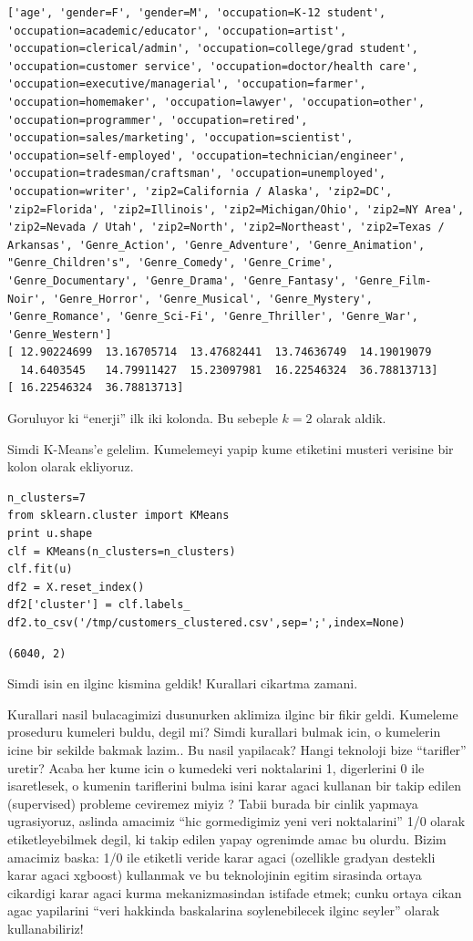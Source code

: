 \documentclass[12pt,fleqn]{article}\usepackage{../common}
\begin{document}
\begin{verbatim}
['age', 'gender=F', 'gender=M', 'occupation=K-12 student', 'occupation=academic/educator', 'occupation=artist', 'occupation=clerical/admin', 'occupation=college/grad student', 'occupation=customer service', 'occupation=doctor/health care', 'occupation=executive/managerial', 'occupation=farmer', 'occupation=homemaker', 'occupation=lawyer', 'occupation=other', 'occupation=programmer', 'occupation=retired', 'occupation=sales/marketing', 'occupation=scientist', 'occupation=self-employed', 'occupation=technician/engineer', 'occupation=tradesman/craftsman', 'occupation=unemployed', 'occupation=writer', 'zip2=California / Alaska', 'zip2=DC', 'zip2=Florida', 'zip2=Illinois', 'zip2=Michigan/Ohio', 'zip2=NY Area', 'zip2=Nevada / Utah', 'zip2=North', 'zip2=Northeast', 'zip2=Texas / Arkansas', 'Genre_Action', 'Genre_Adventure', 'Genre_Animation', "Genre_Children's", 'Genre_Comedy', 'Genre_Crime', 'Genre_Documentary', 'Genre_Drama', 'Genre_Fantasy', 'Genre_Film-Noir', 'Genre_Horror', 'Genre_Musical', 'Genre_Mystery', 'Genre_Romance', 'Genre_Sci-Fi', 'Genre_Thriller', 'Genre_War', 'Genre_Western']
[ 12.90224699  13.16705714  13.47682441  13.74636749  14.19019079
  14.6403545   14.79911427  15.23097981  16.22546324  36.78813713]
[ 16.22546324  36.78813713]
\end{verbatim}

Goruluyor ki ``enerji'' ilk iki kolonda. Bu sebeple $k=2$ olarak aldik.

Simdi K-Means'e gelelim. Kumelemeyi yapip kume etiketini musteri verisine
bir kolon olarak ekliyoruz. 

\begin{verbatim}
n_clusters=7
from sklearn.cluster import KMeans
print u.shape
clf = KMeans(n_clusters=n_clusters)
clf.fit(u)    
df2 = X.reset_index()
df2['cluster'] = clf.labels_
df2.to_csv('/tmp/customers_clustered.csv',sep=';',index=None)
\end{verbatim}

\begin{verbatim}
(6040, 2)
\end{verbatim}

Simdi isin en ilginc kismina geldik! Kurallari cikartma zamani.

Kurallari nasil bulacagimizi dusunurken aklimiza ilginc bir fikir
geldi. Kumeleme proseduru kumeleri buldu, degil mi? Simdi kurallari bulmak
icin, o kumelerin icine bir sekilde bakmak lazim.. Bu nasil yapilacak?
Hangi teknoloji bize ``tarifler'' uretir? Acaba her kume icin o kumedeki
veri noktalarini 1, digerlerini 0 ile isaretlesek, o kumenin tariflerini
bulma isini karar agaci kullanan bir takip edilen (supervised) probleme
ceviremez miyiz ? Tabii burada bir cinlik yapmaya ugrasiyoruz, aslinda
amacimiz ``hic gormedigimiz yeni veri noktalarini'' 1/0 olarak
etiketleyebilmek degil, ki takip edilen yapay ogrenimde amac bu
olurdu. Bizim amacimiz baska: 1/0 ile etiketli veride karar agaci
(ozellikle gradyan destekli karar agaci xgboost) kullanmak ve bu
teknolojinin egitim sirasinda ortaya cikardigi karar agaci kurma
mekanizmasindan istifade etmek; cunku ortaya cikan agac yapilarini ``veri
hakkinda baskalarina soylenebilecek ilginc seyler'' olarak kullanabiliriz!
\end{document}
